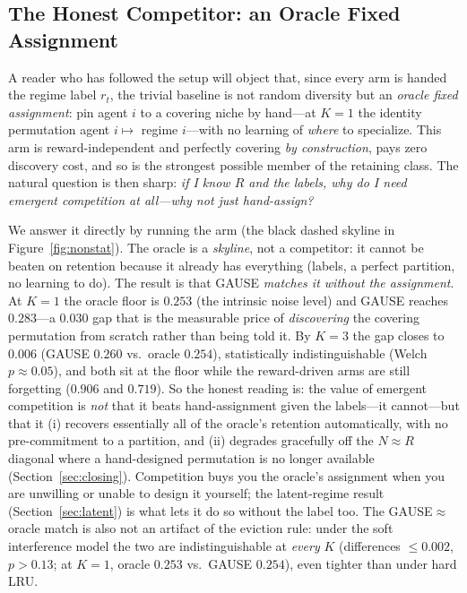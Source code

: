 \documentclass[10pt]{article}
\begin{document}
\subsection{The Honest Competitor: an Oracle Fixed Assignment}
\label{sec:oracle}

A reader who has followed the setup will object that, since every arm is handed
the regime label $r_t$, the trivial baseline is not random diversity but an
\emph{oracle fixed assignment}: pin agent $i$ to a covering niche by hand---at
$K{=}1$ the identity permutation agent $i \mapsto$ regime $i$---with no learning of
\emph{where} to specialize. This arm is reward-independent and perfectly covering
\emph{by construction}, pays zero discovery cost, and so is the strongest possible
member of the retaining class. The natural question is then sharp: \emph{if I know
$R$ and the labels, why do I need emergent competition at all---why not just
hand-assign?}

We answer it directly by running the arm (the black dashed skyline in
Figure~\ref{fig:nonstat}). The oracle is
a \emph{skyline}, not a competitor: it cannot be beaten on retention because it
already has everything (labels, a perfect partition, no learning to do). The
result is that GAUSE \emph{matches it without the assignment}. At $K{=}1$ the
oracle floor is $0.253$ (the intrinsic noise level) and GAUSE reaches $0.283$---a
$0.030$ gap that is the measurable price of \emph{discovering} the covering
permutation from scratch rather than being told it. By $K{=}3$ the gap closes to
$0.006$ (GAUSE $0.260$ vs.\ oracle $0.254$), statistically indistinguishable
(Welch $p\approx0.05$), and both sit at the floor while the reward-driven arms are
still forgetting ($0.906$ and $0.719$). So the honest reading is: the value of
emergent competition is \emph{not} that it beats hand-assignment given the
labels---it cannot---but that it (i) recovers essentially all of the oracle's
retention automatically, with no pre-commitment to a partition, and (ii) degrades
gracefully off the $N\approx R$ diagonal where a hand-designed permutation is no
longer available (Section~\ref{sec:closing}). Competition buys you the oracle's
assignment when you are unwilling or unable to design it yourself; the latent-regime
result (Section~\ref{sec:latent}) is what lets it do so without the label too.
The GAUSE$\approx$oracle match is also not an artifact of the eviction rule: under
the soft interference model the two are indistinguishable at \emph{every} $K$
(differences $\le0.002$, $p>0.13$; at $K{=}1$, oracle $0.253$ vs.\ GAUSE $0.254$),
even tighter than under hard LRU.
\end{document}
